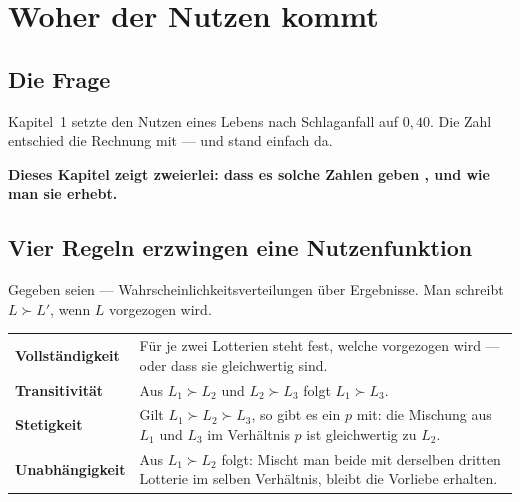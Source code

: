 \chapter{Woher der Nutzen kommt}

\section{Die Frage}

\begin{merksatz}
Kapitel~1 setzte den Nutzen eines Lebens nach Schlaganfall auf $0{,}40$. Die Zahl entschied die Rechnung mit --- und stand einfach da.

\begin{center}
\begin{minipage}{0.9\textwidth}
\textbf{Dieses Kapitel zeigt zweierlei: dass es solche Zahlen geben , und wie man sie erhebt.}
\end{minipage}
\end{center}
\end{merksatz}

\section{Vier Regeln erzwingen eine Nutzenfunktion}

\begin{merksatz}
Gegeben seien  --- Wahrscheinlichkeitsverteilungen über Ergebnisse. Man schreibt $L \succ L'$, wenn $L$ vorgezogen wird.

\begin{center}
{\small
\renewcommand{\arraystretch}{1.55}
\begin{tabular}{@{}P{2.8cm}P{5.8cm}@{}}
\toprule
\textbf{Vollständigkeit} & Für je zwei Lotterien steht fest, welche vorgezogen wird --- oder dass sie gleichwertig sind.\\
\textbf{Transitivität} & Aus $L_1 \succ L_2$ und $L_2 \succ L_3$ folgt $L_1 \succ L_3$.\\
\textbf{Stetigkeit} & Gilt $L_1 \succ L_2 \succ L_3$, so gibt es ein $p$ mit: die Mischung aus $L_1$ und $L_3$ im Verhältnis $p$ ist gleichwertig zu $L_2$.\\
\textbf{Unabhängigkeit} & Aus $L_1 \succ L_2$ folgt: Mischt man beide mit derselben dritten Lotterie im selben Verhältnis, bleibt die Vorliebe erhalten.\\
\bottomrule
\end{tabular}}
\end{center}
\end{merksatz}

